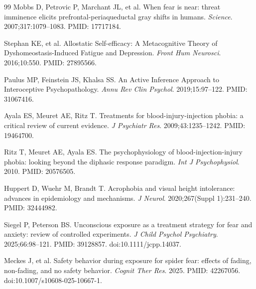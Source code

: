 \documentclass[9pt,twocolumn]{article}
\begin{document}
\begin{thebibliography}{99}
Mobbs D, Petrovic P, Marchant JL, et al. When fear is near: threat imminence elicits prefrontal-periaqueductal gray shifts in humans. \emph{Science}. 2007;317:1079--1083. PMID: 17717184.

Stephan KE, et al. Allostatic Self-efficacy: A Metacognitive Theory of Dyshomeostasis-Induced Fatigue and Depression. \emph{Front Hum Neurosci}. 2016;10:550. PMID: 27895566.

Paulus MP, Feinstein JS, Khalsa SS. An Active Inference Approach to Interoceptive Psychopathology. \emph{Annu Rev Clin Psychol}. 2019;15:97--122. PMID: 31067416.

Ayala ES, Meuret AE, Ritz T. Treatments for blood-injury-injection phobia: a critical review of current evidence. \emph{J Psychiatr Res}. 2009;43:1235--1242. PMID: 19464700.

Ritz T, Meuret AE, Ayala ES. The psychophysiology of blood-injection-injury phobia: looking beyond the diphasic response paradigm. \emph{Int J Psychophysiol}. 2010. PMID: 20576505.

Huppert D, Wuehr M, Brandt T. Acrophobia and visual height intolerance: advances in epidemiology and mechanisms. \emph{J Neurol}. 2020;267(Suppl 1):231--240. PMID: 32444982.

Siegel P, Peterson BS. Unconscious exposure as a treatment strategy for fear and anxiety: review of controlled experiments. \emph{J Child Psychol Psychiatry}. 2025;66:98--121. PMID: 39128857. doi:10.1111/jcpp.14037.

Meckes J, et al. Safety behavior during exposure for spider fear: effects of fading, non-fading, and no safety behavior. \emph{Cognit Ther Res}. 2025. PMID: 42267056. doi:10.1007/s10608-025-10667-1.

\end{thebibliography}

\balance
\end{document}
